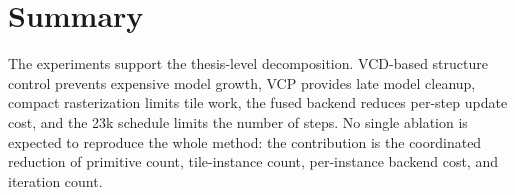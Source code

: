\section{Summary}

The experiments support the thesis-level decomposition. VCD-based structure
control prevents expensive model growth, VCP provides late model cleanup,
compact rasterization limits tile work, the fused backend reduces per-step
update cost, and the 23k schedule limits the number of steps. No single
ablation is expected to reproduce the whole method: the contribution is the
coordinated reduction of primitive count, tile-instance count, per-instance
backend cost, and iteration count.
